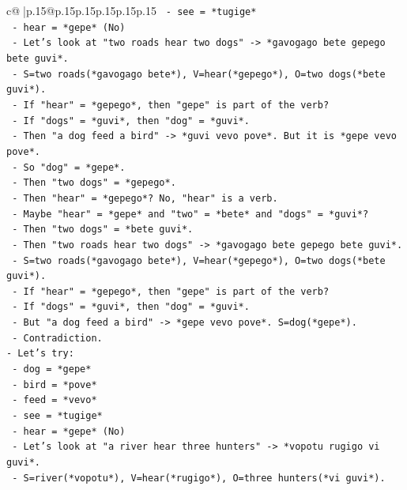 \documentclass{article}
\begin{document}
{\begin{supertabular}{c@{$\;$}|p{.15\linewidth}@{}p{.15\linewidth}p{.15\linewidth}p{.15\linewidth}p{.15\linewidth}p{.15\linewidth}}
{{{\texttt{  {-} see = *tugige*} \\
\texttt{  {-} hear = *gepe* (No)} \\
\texttt{  {-} Let's look at "two roads hear two dogs" {-}> *gavogago bete gepego bete guvi*.} \\
\texttt{    {-} S=two roads(*gavogago bete*), V=hear(*gepego*), O=two dogs(*bete guvi*).} \\
\texttt{    {-} If "hear" = *gepego*, then "gepe" is part of the verb?} \\
\texttt{    {-} If "dogs" = *guvi*, then "dog" = *guvi*.} \\
\texttt{    {-} Then "a dog feed a bird" {-}> *guvi vevo pove*. But it is *gepe vevo pove*.} \\
\texttt{    {-} So "dog" = *gepe*.} \\
\texttt{    {-} Then "two dogs" = *gepego*.} \\
\texttt{    {-} Then "hear" = *gepego*? No, "hear" is a verb.} \\
\texttt{    {-} Maybe "hear" = *gepe* and "two" = *bete* and "dogs" = *guvi*?} \\
\texttt{    {-} Then "two dogs" = *bete guvi*.} \\
\texttt{    {-} Then "two roads hear two dogs" {-}> *gavogago bete gepego bete guvi*.} \\
\texttt{      {-} S=two roads(*gavogago bete*), V=hear(*gepego*), O=two dogs(*bete guvi*).} \\
\texttt{      {-} If "hear" = *gepego*, then "gepe" is part of the verb?} \\
\texttt{      {-} If "dogs" = *guvi*, then "dog" = *guvi*.} \\
\texttt{      {-} But "a dog feed a bird" {-}> *gepe vevo pove*. S=dog(*gepe*).} \\
\texttt{      {-} Contradiction.} \\
\texttt{{-} Let's try:} \\
\texttt{  {-} dog = *gepe*} \\
\texttt{  {-} bird = *pove*} \\
\texttt{  {-} feed = *vevo*} \\
\texttt{  {-} see = *tugige*} \\
\texttt{  {-} hear = *gepe* (No)} \\
\texttt{  {-} Let's look at "a river hear three hunters" {-}> *vopotu rugigo vi guvi*.} \\
\texttt{    {-} S=river(*vopotu*), V=hear(*rugigo*), O=three hunters(*vi guvi*).} \\
}}}
\end{supertabular}}
\end{document}
